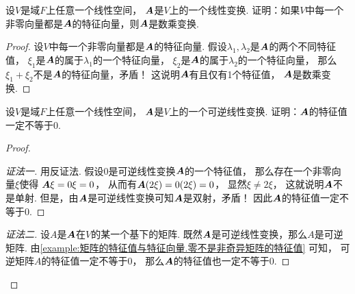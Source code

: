 \begin{example}
设\(V\)是域\(F\)上任意一个线性空间，
\(\boldsymbol{A}\)是\(V\)上的一个线性变换.
证明：如果\(V\)中每一个非零向量都是\(\boldsymbol{A}\)的特征向量，则\(\boldsymbol{A}\)是数乘变换.
\begin{proof}
设\(V\)中每一个非零向量都是\(\boldsymbol{A}\)的特征向量.
假设\(\lambda_1,\lambda_2\)是\(\boldsymbol{A}\)的两个不同特征值，
\(\xi_1\)是\(\boldsymbol{A}\)的属于\(\lambda_1\)的一个特征向量，
\(\xi_2\)是\(\boldsymbol{A}\)的属于\(\lambda_2\)的一个特征向量，
那么\(\xi_1+\xi_2\)不是\(\boldsymbol{A}\)的特征向量，矛盾！
这说明\(\boldsymbol{A}\)有且仅有1个特征值，
\(\boldsymbol{A}\)是数乘变换.
\end{proof}
\end{example}

\begin{example}
设\(V\)是域\(F\)上任意一个线性空间，
\(\boldsymbol{A}\)是\(V\)上的一个可逆线性变换.
证明：\(\boldsymbol{A}\)的特征值一定不等于\(0\).
\begin{proof}
\begin{proof}[证法一]
用反证法.
假设\(0\)是可逆线性变换\(\boldsymbol{A}\)的一个特征值，
那么存在一个非零向量\(\xi\)使得
\(\boldsymbol{A}\xi = 0\xi = 0\)，
从而有\(\boldsymbol{A}(2\xi) = 0(2\xi) = 0\)，
显然\(\xi \neq 2\xi\)，
这就说明\(\boldsymbol{A}\)不是单射.
但是，由\(\boldsymbol{A}\)是可逆线性变换可知\(\boldsymbol{A}\)是双射，矛盾！
因此\(\boldsymbol{A}\)的特征值一定不等于\(0\).
\end{proof}
\begin{proof}[证法二]
设\(A\)是\(\boldsymbol{A}\)在\(V\)的某一个基下的矩阵.
既然\(\boldsymbol{A}\)是可逆线性变换，那么\(A\)是可逆矩阵.
由\cref{example:矩阵的特征值与特征向量.零不是非奇异矩阵的特征值} 可知，
可逆矩阵\(A\)的特征值一定不等于\(0\)，
那么\(\boldsymbol{A}\)的特征值也一定不等于\(0\).
\end{proof}\let\qed\relax
\end{proof}
\end{example}

